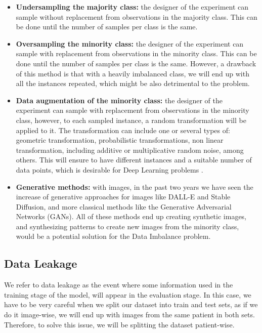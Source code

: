 \documentclass[conference]{IEEEtran}
\begin{document}
\begin{itemize}
\item \textbf{Undersampling the majority class:} the designer of the experiment can sample without replacement from observations in the majority class. This can be done until the number of samples per class is the same\cite{SMOTE}. 

\item \textbf{Oversampling the minority class:} the designer of the experiment can sample with replacement from observations in the minority class. This can be done until the number of samples per class is the same. However, a drawback of this method is that with a heavily imbalanced class, we will end up with all the instances repeated, which might be also detrimental to the problem\cite{SMOTE}.

\item \textbf{Data augmentation of the minority class:} the designer of the experiment can sample with replacement from observations in the minority class, however, to each sampled instance, a random transformation will be applied to it. The transformation can include one or several types of: geometric transformation, probabilistic transformations, non linear transformation, including additive or multiplicative random noise, among others. This will ensure to have different instances and a suitable number of data points, which is desirable for Deep Learning problems \cite{Goodfellow2016}. 

\item \textbf{Generative methods: } with images, in the past two years we have seen the increase of generative approaches for images like DALL-E and Stable Diffusion, and more classical methods like the Generative Adversarial Networks (GANs). All of these methods end up creating synthetic images, and synthesizing patterns to create new images from the minority class, would be a potential solution for the Data Imbalance problem\cite{Goodfellow2016}. 
\end{itemize}

\subsection{Data Leakage}

We refer to data leakage as the event where some information used in the training stage of the model, will appear in the evaluation stage. In this case, we have to be very careful when we split our dataset into train and test sets, as if we do it image-wise, we will end up with images from the same patient in both sets. Therefore, to solve this issue, we will be splitting the dataset patient-wise\cite{wen2020}. 
\end{document}
